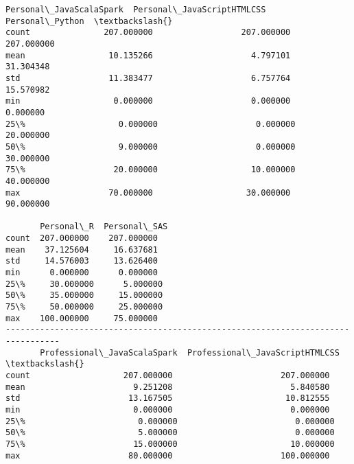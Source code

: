 \documentclass[11pt]{article}
\begin{document}
    \begin{Verbatim}[commandchars=\\\{\}]
       Personal\_JavaScalaSpark  Personal\_JavaScriptHTMLCSS  Personal\_Python  \textbackslash{}
count               207.000000                  207.000000       207.000000   
mean                 10.135266                    4.797101        31.304348   
std                  11.383477                    6.757764        15.570982   
min                   0.000000                    0.000000         0.000000   
25\%                   0.000000                    0.000000        20.000000   
50\%                   9.000000                    0.000000        30.000000   
75\%                  20.000000                   10.000000        40.000000   
max                  70.000000                   30.000000        90.000000   

       Personal\_R  Personal\_SAS  
count  207.000000    207.000000  
mean    37.125604     16.637681  
std     14.576003     13.626400  
min      0.000000      0.000000  
25\%     30.000000      5.000000  
50\%     35.000000     15.000000  
75\%     50.000000     25.000000  
max    100.000000     75.000000  
---------------------------------------------------------------------------------
       Professional\_JavaScalaSpark  Professional\_JavaScriptHTMLCSS  \textbackslash{}
count                   207.000000                      207.000000   
mean                      9.251208                        5.840580   
std                      13.167505                       10.812555   
min                       0.000000                        0.000000   
25\%                       0.000000                        0.000000   
50\%                       5.000000                        0.000000   
75\%                      15.000000                       10.000000   
max                      80.000000                      100.000000   


\end{Verbatim}
\end{document}

